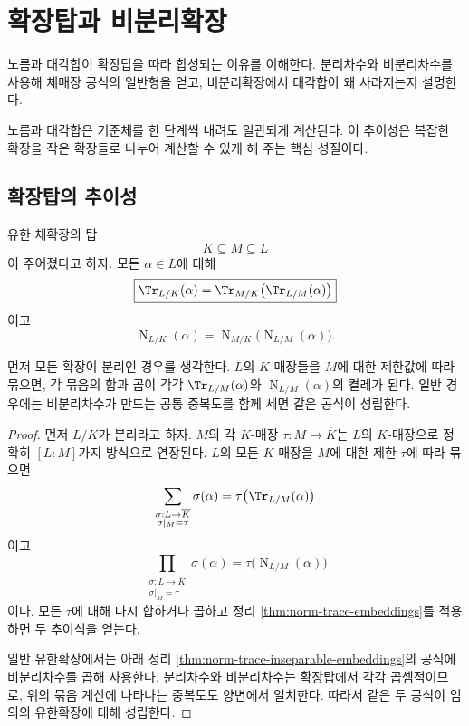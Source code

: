 \clearpage
\section{확장탑과 비분리확장}
\label{sec:norm-trace-towers-inseparability}

\begin{learninggoal}
노름과 대각합이 확장탑을 따라 합성되는 이유를 이해한다. 분리차수와 비분리차수를 사용해 체매장 공식의 일반형을 얻고, 비분리확장에서 대각합이 왜 사라지는지 설명한다.
\end{learninggoal}

노름과 대각합은 기준체를 한 단계씩 내려도 일관되게 계산된다. 이 추이성은 복잡한 확장을 작은 확장들로 나누어 계산할 수 있게 해 주는 핵심 성질이다.

\subsection{확장탑의 추이성}

\begin{theorem}
\label{thm:norm-trace-transitivity}
유한 체확장의 탑
\[
  K\subseteq M\subseteq L
\]
이 주어졌다고 하자. 모든 $\alpha\in L$에 대해
\[
  \boxed{
  \Tr_{L/K}(\alpha)
  =\Tr_{M/K}\bigl(\Tr_{L/M}(\alpha)\bigr)}
\]
이고
\[
  \boxed{
  \operatorname N_{L/K}(\alpha)
  =\operatorname N_{M/K}\bigl(\operatorname N_{L/M}(\alpha)\bigr).}
\]
\end{theorem}

\begin{proofidea}
먼저 모든 확장이 분리인 경우를 생각한다. $L$의 $K$-매장들을 $M$에 대한 제한값에 따라 묶으면, 각 묶음의 합과 곱이 각각 $\Tr_{L/M}(\alpha)$와 $\operatorname N_{L/M}(\alpha)$의 켤레가 된다. 일반 경우에는 비분리차수가 만드는 공통 중복도를 함께 세면 같은 공식이 성립한다.
\end{proofidea}

\begin{proof}
먼저 $L/K$가 분리라고 하자. $M$의 각 $K$-매장 $\tau:M\to\overline K$는 $L$의 $K$-매장으로 정확히 $[L:M]$가지 방식으로 연장된다. $L$의 모든 $K$-매장을 $M$에 대한 제한 $\tau$에 따라 묶으면
\[
  \sum_{\substack{\sigma:L\to\overline K\\\sigma|_M=\tau}}
  \sigma(\alpha)
  =\tau\bigl(\Tr_{L/M}(\alpha)\bigr)
\]
이고
\[
  \prod_{\substack{\sigma:L\to\overline K\\\sigma|_M=\tau}}
  \sigma(\alpha)
  =\tau\bigl(\operatorname N_{L/M}(\alpha)\bigr)
\]
이다. 모든 $\tau$에 대해 다시 합하거나 곱하고 정리 \ref{thm:norm-trace-embeddings}를 적용하면 두 추이식을 얻는다.

일반 유한확장에서는 아래 정리 \ref{thm:norm-trace-inseparable-embeddings}의 공식에 비분리차수를 곱해 사용한다. 분리차수와 비분리차수는 확장탑에서 각각 곱셈적이므로, 위의 묶음 계산에 나타나는 중복도도 양변에서 일치한다. 따라서 같은 두 공식이 임의의 유한확장에 대해 성립한다.
\end{proof}

